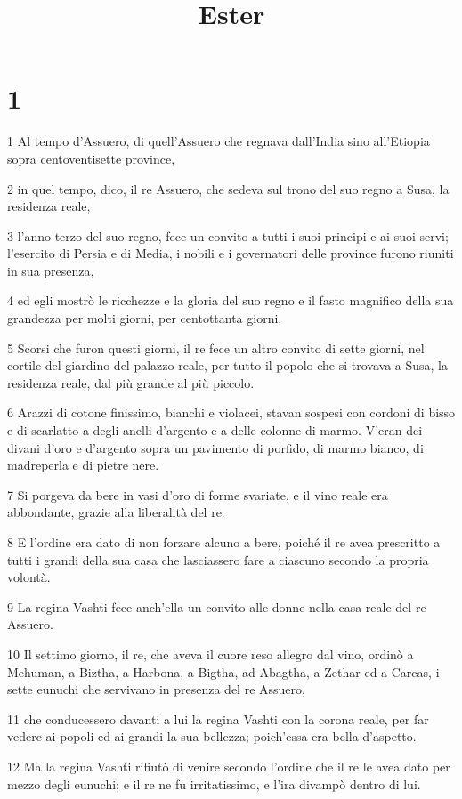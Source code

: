 

\title{Ester}


\chapter{1}

\par 1 Al tempo d'Assuero, di quell'Assuero che regnava dall'India sino all'Etiopia sopra centoventisette province,
\par 2 in quel tempo, dico, il re Assuero, che sedeva sul trono del suo regno a Susa, la residenza reale,
\par 3 l'anno terzo del suo regno, fece un convito a tutti i suoi principi e ai suoi servi; l'esercito di Persia e di Media, i nobili e i governatori delle province furono riuniti in sua presenza,
\par 4 ed egli mostrò le ricchezze e la gloria del suo regno e il fasto magnifico della sua grandezza per molti giorni, per centottanta giorni.
\par 5 Scorsi che furon questi giorni, il re fece un altro convito di sette giorni, nel cortile del giardino del palazzo reale, per tutto il popolo che si trovava a Susa, la residenza reale, dal più grande al più piccolo.
\par 6 Arazzi di cotone finissimo, bianchi e violacei, stavan sospesi con cordoni di bisso e di scarlatto a degli anelli d'argento e a delle colonne di marmo. V'eran dei divani d'oro e d'argento sopra un pavimento di porfido, di marmo bianco, di madreperla e di pietre nere.
\par 7 Si porgeva da bere in vasi d'oro di forme svariate, e il vino reale era abbondante, grazie alla liberalità del re.
\par 8 E l'ordine era dato di non forzare alcuno a bere, poiché il re avea prescritto a tutti i grandi della sua casa che lasciassero fare a ciascuno secondo la propria volontà.
\par 9 La regina Vashti fece anch'ella un convito alle donne nella casa reale del re Assuero.
\par 10 Il settimo giorno, il re, che aveva il cuore reso allegro dal vino, ordinò a Mehuman, a Biztha, a Harbona, a Bigtha, ad Abagtha, a Zethar ed a Carcas, i sette eunuchi che servivano in presenza del re Assuero,
\par 11 che conducessero davanti a lui la regina Vashti con la corona reale, per far vedere ai popoli ed ai grandi la sua bellezza; poich'essa era bella d'aspetto.
\par 12 Ma la regina Vashti rifiutò di venire secondo l'ordine che il re le avea dato per mezzo degli eunuchi; e il re ne fu irritatissimo, e l'ira divampò dentro di lui.

